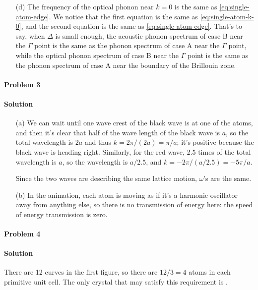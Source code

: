 \documentclass[hyperref, a4paper]{article}
\begin{document}
\begin{itemize}
\item[(d)] The frequency of the optical phonon near $k=0$ is the same as \eqref{eq:single-atom-edge}.
We notice that the first equation is the same as \eqref{eq:single-atom-k-0},
and the second equation is the same as \eqref{eq:single-atom-edge}.
That's to say, when $\Delta$ is small enough,
the acoustic phonon spectrum of case B near the $\Gamma$ point 
is the same as the phonon spectrum of case A near the $\Gamma$ point,
while the optical phonon spectrum of case B near the $\Gamma$ point 
is the same as the phonon spectrum of case A near the boundary of the Brillouin zone.

\end{itemize}

\paragraph{Problem 3} 

\paragraph{Solution}

\begin{itemize}
\item[(a)] We can wait until one wave crest of the black wave is at one of the atoms,
and then it's clear that half of the wave length of the black wave is $a$,
so the total wavelength is $2a$ and thus $k = 2\pi / (2a) = \pi / a$;
it's positive because the black wave is heading right.
Similarly, for the red wave, 
2.5 times of the total wavelength is $a$, so the wavelength is $a / 2.5$,
and $k = - 2\pi / (a / 2.5) = - 5 \pi / a$.

Since the two waves are describing the same lattice motion,
$\omega$'s are the same.

\item[(b)] In the animation, 
each atom is moving as if it's a harmonic oscillator away from anything else,
so there is no transmission of energy here:
the speed of energy transmission is zero.
\end{itemize}

\paragraph{Problem 4}

\paragraph{Solution} There are 12 curves in the first figure, 
so there are $12 / 3 = 4$ atoms in each primitive unit cell.
The only crystal that may satisfy this requirement is .
\end{document}
